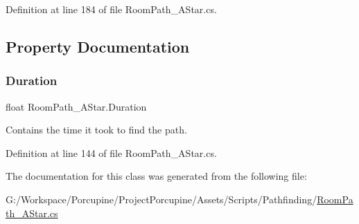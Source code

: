 Definition at line 184 of file Room\+Path\+\_\+\+A\+Star.\+cs.



\subsection{Property Documentation}
\mbox{\label{class_room_path___a_star_a6acd0da2e2db3493a3f094caf2e88e0a}} 
\subsubsection{\texorpdfstring{Duration}{Duration}}
{\footnotesize\ttfamily float Room\+Path\+\_\+\+A\+Star.\+Duration\hspace{0.3cm}{\ttfamily [get]}}



Contains the time it took to find the path. 



Definition at line 144 of file Room\+Path\+\_\+\+A\+Star.\+cs.



The documentation for this class was generated from the following file\+:\begin{DoxyCompactItemize}
\item 
G\+:/\+Workspace/\+Porcupine/\+Project\+Porcupine/\+Assets/\+Scripts/\+Pathfinding/\hyperlink{_room_path___a_star_8cs}{Room\+Path\+\_\+\+A\+Star.\+cs}\end{DoxyCompactItemize}
